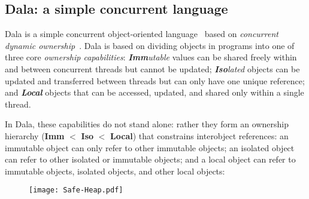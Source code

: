 \subsection{Dala: a simple concurrent language}
\label{DALAA}

Dala is a simple concurrent object-oriented language~\cite{Dalarna,dala-onward2021} based on \textit{concurrent dynamic  ownership}~\cite{dynamicOwn,dynamicAlias}.
Dala is based on dividing objects in programs
into one of three core \textit{ownership capabilities}:
%
%
\emph{\textbf{Imm}utable} values can be shared freely within and
between concurrent threads but cannot be updated;
\emph{\textbf{Iso}lated} objects can be updated and transferred
between threads but can only have one unique reference; and
\emph{\textbf{Local}} objects that can be accessed, updated, and
shared only within a single thread.

In Dala, these capabilities do not stand alone:
rather they form an ownership hierarchy (\textbf{Imm} $<$ \textbf{Iso}
$<$ \textbf{Local}) that constrains interobject references:
an immutable
object can only refer to other immutable objects; an isolated
object can refer to other isolated or immutable objects; and a local object
can refer to immutable objects, isolated objects, and other local
objects:

\begin{figure}[!h]
\centering
\texttt{[image: Safe-Heap.pdf]}
\end{figure}

